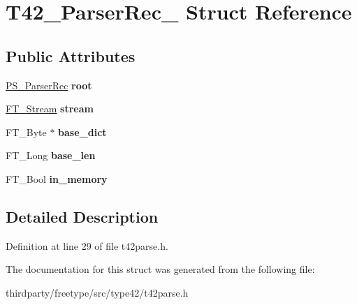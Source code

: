 \hypertarget{struct_t42___parser_rec__}{}\section{T42\+\_\+\+Parser\+Rec\+\_\+ Struct Reference}
\label{struct_t42___parser_rec__}
\subsection*{Public Attributes}
\begin{DoxyCompactItemize}
\item 
\mbox{\label{struct_t42___parser_rec___aee44d4d0e5fd767c7e6e1a8fcbe3d33f}} 
\hyperlink{struct_p_s___parser_rec__}{P\+S\+\_\+\+Parser\+Rec} {\bfseries root}
\item 
\mbox{\label{struct_t42___parser_rec___a8859f0cdbb370a4dd0230cc2954cec84}} 
\hyperlink{struct_f_t___stream_rec__}{F\+T\+\_\+\+Stream} {\bfseries stream}
\item 
\mbox{\label{struct_t42___parser_rec___a488024642128a55e16e2e67dac725690}} 
F\+T\+\_\+\+Byte $\ast$ {\bfseries base\+\_\+dict}
\item 
\mbox{\label{struct_t42___parser_rec___aeb1dd4dfb9c4e5e81a10d9731d58dc3e}} 
F\+T\+\_\+\+Long {\bfseries base\+\_\+len}
\item 
\mbox{\label{struct_t42___parser_rec___aff0398876f4d45b24feb00dc06c124ea}} 
F\+T\+\_\+\+Bool {\bfseries in\+\_\+memory}
\end{DoxyCompactItemize}


\subsection{Detailed Description}


Definition at line 29 of file t42parse.\+h.



The documentation for this struct was generated from the following file\+:\begin{DoxyCompactItemize}
\item 
thirdparty/freetype/src/type42/t42parse.\+h\end{DoxyCompactItemize}
